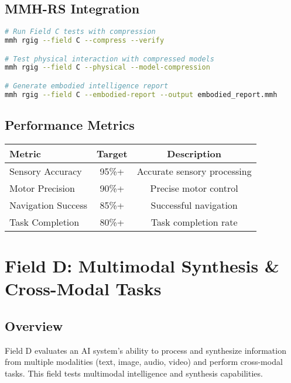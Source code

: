 \documentclass[12pt,a4paper]{article}
\begin{document}
\subsection{MMH-RS Integration}
\begin{lstlisting}[language=bash, caption=Field C Testing with MMH-RS]
# Run Field C tests with compression
mmh rgig --field C --compress --verify

# Test physical interaction with compressed models
mmh rgig --field C --physical --model-compression

# Generate embodied intelligence report
mmh rgig --field C --embodied-report --output embodied_report.mmh
\end{lstlisting}

\subsection{Performance Metrics}
\begin{center}
\begin{tabular}{|l|c|c|}
\hline
\textbf{Metric} & \textbf{Target} & \textbf{Description} \\
\hline
Sensory Accuracy & 95\%+ & Accurate sensory processing \\
Motor Precision & 90\%+ & Precise motor control \\
Navigation Success & 85\%+ & Successful navigation \\
Task Completion & 80\%+ & Task completion rate \\
\hline
\end{tabular}
\end{center}

\newpage

\section{Field D: Multimodal Synthesis \& Cross-Modal Tasks}

\subsection{Overview}
Field D evaluates an AI system's ability to process and synthesize information from multiple modalities (text, image, audio, video) and perform cross-modal tasks. This field tests multimodal intelligence and synthesis capabilities.
\end{document}
